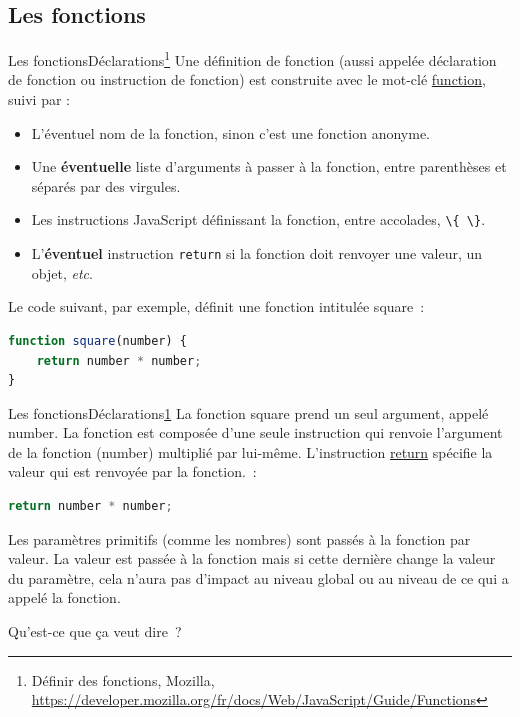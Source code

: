 \documentclass{beamer}
\begin{document}
    \subsection{Les fonctions}\label{subsec:functions}
    \begin{frame}[fragile]{Les fonctions}{Déclarations\footnote{\label{mozilla-function}Définir des fonctions, Mozilla, \url{https://developer.mozilla.org/fr/docs/Web/JavaScript/Guide/Functions}}}
        Une définition de fonction (aussi appelée déclaration de fonction ou instruction de fonction) est construite avec le mot-clé \href{https://developer.mozilla.org/fr/docs/Web/JavaScript/Reference/Statements/function}{function}, suivi par :
        \begin{itemize}
            \item L'éventuel nom de la fonction, sinon c'est une fonction anonyme.
            \item Une \textbf{éventuelle} liste d'arguments à passer à la fonction, entre parenthèses et séparés par des virgules.
            \item Les instructions JavaScript définissant la fonction, entre accolades, \lstinline[language=Javascript]!\{ \}!.
            \item L'\textbf{éventuel} instruction \lstinline{return} si la fonction doit renvoyer une valeur, un objet, \textit{etc}.
        \end{itemize}
        \bigbreak
        Le code suivant, par exemple, définit une fonction intitulée square~:
        \begin{lstlisting}[language=JavaScript]
function square(number) {
    return number * number;
}
        \end{lstlisting}
    \end{frame}

    \begin{frame}[fragile]{Les fonctions}{Déclarations\cref{mozilla-function}}
        La fonction square prend un seul argument, appelé number.
        La fonction est composée d'une seule instruction qui renvoie l'argument de la fonction (number) multiplié par lui-même.
        L'instruction \href{https://developer.mozilla.org/fr/docs/Web/JavaScript/Reference/Statements/return}{return} spécifie la valeur qui est renvoyée par la fonction.~:
        \begin{lstlisting}[language=JavaScript]
    return number * number;
        \end{lstlisting}
        \begin{dangercolorbox}
            Les paramètres primitifs (comme les nombres) sont passés à la fonction par valeur.
            La valeur est passée à la fonction mais si cette dernière change la valeur du paramètre, cela n'aura pas d'impact au niveau global ou au niveau de ce qui a appelé la fonction.
        \end{dangercolorbox}
        Qu'est-ce que ça veut dire~?
    \end{frame}
\end{document}
